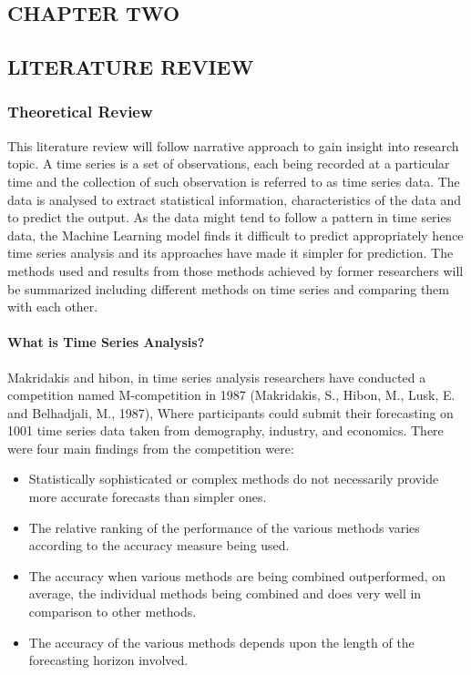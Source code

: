 \documentclass[10pt]{report}
\begin{document}
\begin{flushleft}
		\chapter{CHAPTER  TWO}
		\section{LITERATURE REVIEW}
		\subsection{Theoretical Review}
		This literature review will follow narrative approach to gain insight into research topic. A time series is a set of observations, each being recorded at a particular time and the collection of such observation is referred to as time series data. The data is analysed to extract statistical information, characteristics of the data and to predict the output. As the data might tend to follow a pattern in time series data, the Machine Learning model finds it difficult to predict appropriately hence time series analysis and its approaches have made it simpler for prediction. The methods used and results from those methods achieved by former researchers will be summarized including different methods on time series and comparing them with each other.
		
		\subsubsection{What is Time Series Analysis?}
		
		Makridakis and hibon, in time series analysis researchers have conducted a competition named M-competition in 1987 (Makridakis, S., Hibon, M., Lusk, E. and Belhadjali, M., 1987), Where participants could submit their forecasting on 1001 time series data taken from demography, industry, and economics. There were four main findings from the competition were:\\
		\begin{itemize}
		\item	Statistically sophisticated or complex methods do not necessarily provide more accurate forecasts than simpler ones.
		\item	The relative ranking of the performance of the various methods varies according to the accuracy measure being used.
		\item	The accuracy when various methods are being combined outperformed, on average, the individual methods being combined and does very well in comparison to other methods.
		\item	The accuracy of the various methods depends upon the length of the forecasting horizon involved.
		\end{itemize}
		

\end{flushleft}
\end{document}
